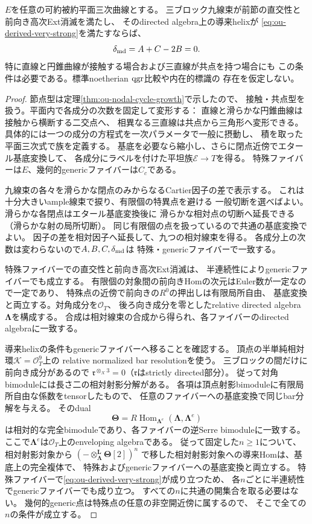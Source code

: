 \begin{theorem}[被約可約三次曲線全体の多重次数の必要条件]
\label{thm:ou-reduced-delta-deformation}
$E$を任意の可約被約平面三次曲線とする。
三ブロック九線束が前節の直交性と前向き高次Ext消滅を満たし、
そのdirected algebra上の導来helixが
\eqref{eq:ou-derived-very-strong}を満たすならば、
\[
 \delta_{\rm md}=A+C-2B=0.
\]
特に直線と円錐曲線が接触する場合および三直線が共点を持つ場合にも
この条件は必要である。標準noetherian $\operatorname{qgr}$比較や内在的標識の
存在を仮定しない。
\end{theorem}
\begin{proof}
節点型は定理\ref{thm:ou-nodal-cycle-growth}で示したので、
接触・共点型を扱う。平面内で各成分の次数を固定して変形する：
直線と滑らかな円錐曲線は接触から横断する二交点へ、
相異なる三直線は共点から三角形へ変形できる。
具体的には一つの成分の方程式を一次パラメータで一般に摂動し、
積を取った平面三次式で族を定義する。
基底を必要なら縮小し、さらに閉点近傍でエタール基底変換して、
各成分にラベルを付けた平坦族$\mathcal E\to T$を得る。
特殊ファイバーは$E$、幾何的genericファイバーは$C_c$である。

九線束の各々を滑らかな閉点のみからなるCartier因子の差で表示する。
これは十分大きいample線束で捩り、有限個の特異点を避ける
一般切断を選べばよい。滑らかな各閉点はエタール基底変換後に
滑らかな相対点の切断へ延長できる（滑らかな射の局所切断）。
同じ有限個の点を扱っているので共通の基底変換でよい。
因子の差を相対因子へ延長して、九つの相対線束を得る。
各成分上の次数は変わらないので$A,B,C,\delta_{\rm md}$は
特殊・genericファイバーで一致する。

特殊ファイバーでの直交性と前向き高次Ext消滅は、
半連続性によりgenericファイバーでも成立する。
有限個の対象間の前向きHomの次元はEuler数が一定なので一定であり、
特殊点の近傍で前向きの$R^0$の押出しは有限局所自由、
基底変換と両立する。対角成分を$\mathcal O_T$、
後ろ向き成分を零としたrelative directed algebra
$\boldsymbol\Lambda$を構成する。
合成は相対線束の合成から得られ、各ファイバーのdirected algebraに一致する。

導来helixの条件もgenericファイバーへ移ることを確認する。
頂点の半単純相対環$\mathcal K=\mathcal O_T^9$上の
relative normalized bar resolutionを使う。
三ブロックの間だけに前向き成分があるので
$\mathfrak r^{\otimes_{\mathcal K}3}=0$（$\mathfrak r$はstrictly directed部分）。
従って対角bimoduleには長さ二の相対射影分解がある。
各項は頂点射影bimoduleに有限局所自由な係数をtensorしたもので、
任意のファイバーへの基底変換で同じbar分解を与える。
そのdual
\[
 \boldsymbol\Theta=
 R\operatorname{Hom}_{\boldsymbol\Lambda^e}
 (\boldsymbol\Lambda,\boldsymbol\Lambda^e)
\]
は相対的な完全bimoduleであり、各ファイバーの逆Serre bimoduleに一致する。
ここで$\boldsymbol\Lambda^e$は$\mathcal O_T$上のenveloping algebraである。
従って固定した$n\geq1$について、相対射影対象から
$(-\otimes^{\mathbf L}_{\boldsymbol\Lambda}\boldsymbol\Theta[2])^n$
で移した相対射影対象への導来Homは、基底上の完全複体で、
特殊およびgenericファイバーへの基底変換と両立する。
特殊ファイバーで\eqref{eq:ou-derived-very-strong}が成り立つため、
各$n$ごとに半連続性でgenericファイバーでも成り立つ。
すべての$n$に共通の開集合を取る必要はない。
幾何的generic点は特殊点の任意の非空開近傍に属するので、
そこで全ての$n$の条件が成立する。


\end{proof}
